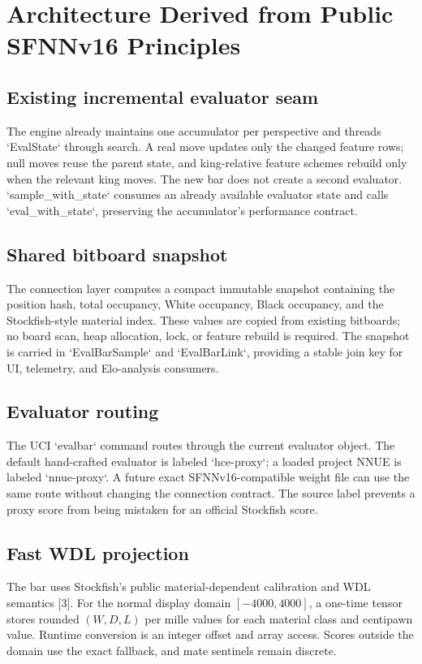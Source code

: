 \documentclass[10pt,conference]{IEEEtran}
\begin{document}
\section{Architecture Derived from Public SFNNv16 Principles}
\subsection{Existing incremental evaluator seam}
The engine already maintains one accumulator per perspective and threads `EvalState` through search. A real move updates only the changed feature rows; null moves reuse the parent state, and king-relative feature schemes rebuild only when the relevant king moves. The new bar does not create a second evaluator. `sample\_with\_state` consumes an already available evaluator state and calls `eval\_with\_state`, preserving the accumulator's performance contract.

\subsection{Shared bitboard snapshot}
The connection layer computes a compact immutable snapshot containing the position hash, total occupancy, White occupancy, Black occupancy, and the Stockfish-style material index. These values are copied from existing bitboards; no board scan, heap allocation, lock, or feature rebuild is required. The snapshot is carried in `EvalBarSample` and `EvalBarLink`, providing a stable join key for UI, telemetry, and Elo-analysis consumers.

\subsection{Evaluator routing}
The UCI `evalbar` command routes through the current evaluator object. The default hand-crafted evaluator is labeled `hce-proxy`; a loaded project NNUE is labeled `nnue-proxy`. A future exact SFNNv16-compatible weight file can use the same route without changing the connection contract. The source label prevents a proxy score from being mistaken for an official Stockfish score.

\subsection{Fast WDL projection}
The bar uses Stockfish's public material-dependent calibration and WDL semantics [3]. For the normal display domain $[-4000,4000]$, a one-time tensor stores rounded $(W,D,L)$ per mille values for each material class and centipawn value. Runtime conversion is an integer offset and array access. Scores outside the domain use the exact fallback, and mate sentinels remain discrete.
\end{document}

